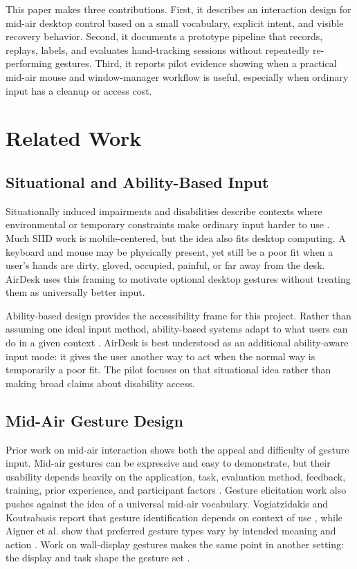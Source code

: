 \documentclass[manuscript]{acmart}
\begin{document}
This paper makes three contributions. First, it describes an interaction design for mid-air desktop control based on a small vocabulary, explicit intent, and visible recovery behavior. Second, it documents a prototype pipeline that records, replays, labels, and evaluates hand-tracking sessions without repeatedly re-performing gestures. Third, it reports pilot evidence showing when a practical mid-air mouse and window-manager workflow is useful, especially when ordinary input has a cleanup or access cost.

\section{Related Work}

\subsection{Situational and Ability-Based Input}

Situationally induced impairments and disabilities describe contexts where environmental or temporary constraints make ordinary input harder to use \cite{sarsenbayeva2019siids}. Much SIID work is mobile-centered, but the idea also fits desktop computing. A keyboard and mouse may be physically present, yet still be a poor fit when a user's hands are dirty, gloved, occupied, painful, or far away from the desk. AirDesk uses this framing to motivate optional desktop gestures without treating them as universally better input.

Ability-based design provides the accessibility frame for this project. Rather than assuming one ideal input method, ability-based systems adapt to what users can do in a given context \cite{wobbrock2011ability}. AirDesk is best understood as an additional ability-aware input mode: it gives the user another way to act when the normal way is temporarily a poor fit. The pilot focuses on that situational idea rather than making broad claims about disability access.

\subsection{Mid-Air Gesture Design}

Prior work on mid-air interaction shows both the appeal and difficulty of gesture input. Mid-air gestures can be expressive and easy to demonstrate, but their usability depends heavily on the application, task, evaluation method, feedback, training, prior experience, and participant factors \cite{koutsabasis2019empiricalmidair,catalano2025usablewithouttouch}. Gesture elicitation work also pushes against the idea of a universal mid-air vocabulary. Vogiatzidakis and Koutsabasis report that gesture identification depends on context of use \cite{vogiatzidakis2018gestureelicitation}, while Aigner et al. show that preferred gesture types vary by intended meaning and action \cite{aigner2012midairgestures}. Work on wall-display gestures makes the same point in another setting: the display and task shape the gesture set \cite{wittorf2016wallgestures}.
\end{document}
